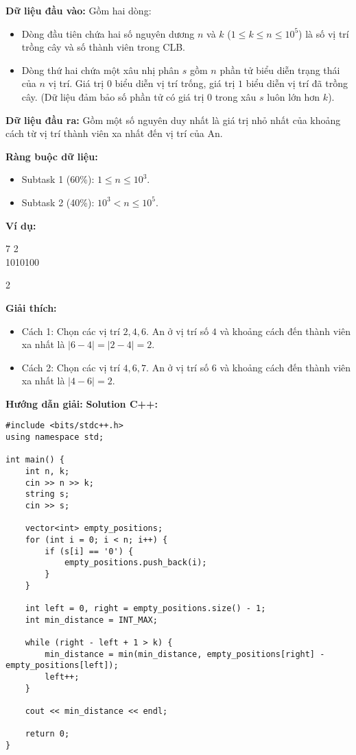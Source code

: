 \documentclass[12pt]{scrartcl}  %
\begin{document}
\textbf{Dữ liệu đầu vào:}
Gồm hai dòng:
\begin{itemize}
    \item Dòng đầu tiên chứa hai số nguyên dương $n$ và $k$ ($1 \leq k \leq n \leq 10^5$) là số vị trí trồng cây và số thành viên trong CLB.
    \item Dòng thứ hai chứa một xâu nhị phân $s$ gồm $n$ phần tử biểu diễn trạng thái của $n$ vị trí. Giá trị $0$ biểu diễn vị trí trống, giá trị $1$ biểu diễn vị trí đã trồng cây. (Dữ liệu đảm bảo số phần tử có giá trị $0$ trong xâu $s$ luôn lớn hơn $k$).
\end{itemize}

\textbf{Dữ liệu đầu ra:}
Gồm một số nguyên duy nhất là giá trị nhỏ nhất của khoảng cách từ vị trí thành viên xa nhất đến vị trí của An.

\textbf{Ràng buộc dữ liệu:}
\begin{itemize}
    \item Subtask 1 (60\%): $1 \leq n \leq 10^3$.
    \item Subtask 2 (40\%): $10^3 < n \leq 10^5$.
\end{itemize}

\textbf{Ví dụ:}
\begin{tcolorbox}[colback=gray!5!white, colframe=blue!50!black, title=Input]
7 2\\
1010100
\end{tcolorbox}
\begin{tcolorbox}[colback=gray!5!white, colframe=green!50!black, title=Output]
2
\end{tcolorbox}

\textbf{Giải thích:}
\begin{itemize}
    \item Cách 1: Chọn các vị trí $2, 4, 6$. An ở vị trí số $4$ và khoảng cách đến thành viên xa nhất là $|6 - 4| = |2 - 4| = 2$.
    \item Cách 2: Chọn các vị trí $4, 6, 7$. An ở vị trí số $6$ và khoảng cách đến thành viên xa nhất là $|4 - 6| = 2$.
\end{itemize}

\textbf{Hướng dẫn giải:}
\textbf{Solution C++:}
\begin{lstlisting}
#include <bits/stdc++.h>
using namespace std;

int main() {
    int n, k;
    cin >> n >> k;
    string s;
    cin >> s;

    vector<int> empty_positions;
    for (int i = 0; i < n; i++) {
        if (s[i] == '0') {
            empty_positions.push_back(i);
        }
    }

    int left = 0, right = empty_positions.size() - 1;
    int min_distance = INT_MAX;

    while (right - left + 1 > k) {
        min_distance = min(min_distance, empty_positions[right] - empty_positions[left]);
        left++;
    }

    cout << min_distance << endl;

    return 0;
}
\end{lstlisting}
\end{document}
